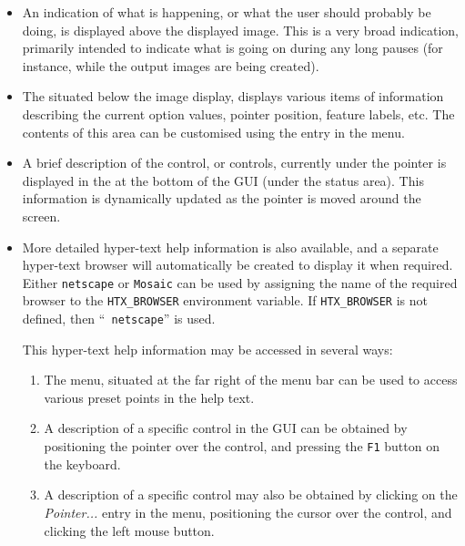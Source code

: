 \begin{itemize}

\item An indication of what is happening, or what the user should
probably be doing, is displayed above the displayed image. This is a very
broad indication, primarily intended to indicate what is going on during
any long pauses (for instance, while the output images are being
created).

\item The  situated below
the image display, displays various items of information describing the
current option values, pointer position, feature labels, etc. The
contents of this area can be customised using the  entry in the  menu.

\item A brief description of the control, or controls, currently under the
pointer is displayed in the  at the
bottom of the GUI (under the status area). This information is
dynamically updated as the pointer is moved around the screen.

\item More detailed hyper-text help information is also available, and a
separate hyper-text browser will automatically be created to display it
when required. Either {\tt netscape} or {\tt Mosaic} can be used by
assigning the name of the required browser to the {\tt HTX\_BROWSER}
environment variable. If {\tt HTX\_BROWSER} is not defined, then ``{\tt
netscape}'' is used.

This hyper-text help information may be accessed in several ways:

\begin{enumerate}

\item The  menu, situated at the
far right of the menu bar can be used to access various preset points in
the help text.

\item A description of a specific control in the GUI can be obtained by 
positioning the pointer over the control, and pressing the {\tt F1}
button on the keyboard.

\item A description of a specific control may also be obtained by clicking 
on the {\em Pointer...} entry in the  menu, positioning the cursor over the control,
and clicking the left mouse button. 

\end{enumerate}

\end{itemize}

